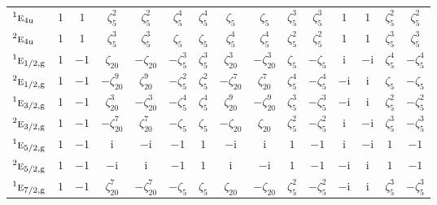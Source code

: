 \documentclass[10pt,a4paper]{article}
\makeatletter
\def\grouprule#1#2{\noalign{\marks\LTgroupmarks{\the\belowrulesep}\nobreak\vskip#1%
  \vskip\aboverulesep}\multispan\LT@cols\unskip{\leaders\hrule\@height#2\hfill\kern\z@}\cr
  \noalign{\penalty\LTrulebreak\vskip\belowrulesep\global\@lastruleclass\z@}}
\numberwithin{equation}{section}
\newcommand{\irr}[1]{\text{\normalfont\scshape #1}}
\newcommand{\conjpair}[1]{{}^{#1}}
\newcommand{\ptag}[1]{\mathrm{#1}}
\newcommand{\iunit}{\mathrm{i}}
\newcommand{\rootunity}[1]{\zeta_{#1}}
\makeatother
\begin{document}
{\begin{longtable}{@{}lcccccccccccccc@{}}
$\conjpair{1}\irr{e}_{4\ptag{u}}$ & $1$ & $1$ & $\rootunity{5}^{2}$ & $\rootunity{5}^{2}$ & $\rootunity{5}^{4}$ & $\rootunity{5}^{4}$ & $\rootunity{5}$ & $\rootunity{5}$ & $\rootunity{5}^{3}$ & $\rootunity{5}^{3}$ & $1$ & $1$ & $\rootunity{5}^{2}$ & $\rootunity{5}^{2}$\\
$\conjpair{2}\irr{e}_{4\ptag{u}}$ & $1$ & $1$ & $\rootunity{5}^{3}$ & $\rootunity{5}^{3}$ & $\rootunity{5}$ & $\rootunity{5}$ & $\rootunity{5}^{4}$ & $\rootunity{5}^{4}$ & $\rootunity{5}^{2}$ & $\rootunity{5}^{2}$ & $1$ & $1$ & $\rootunity{5}^{3}$ & $\rootunity{5}^{3}$\\
\grouprule{0pt}{\lightrulewidth}
$\conjpair{1}\irr{e}_{1/2,\ptag{g}}$ & $1$ & $-1$ & $\rootunity{20}$ & $-\rootunity{20}$ & $-\rootunity{5}^{3}$ & $\rootunity{5}^{3}$ & $\rootunity{20}^{3}$ & $-\rootunity{20}^{3}$ & $\rootunity{5}$ & $-\rootunity{5}$ & $\iunit{}$ & $-\iunit{}$ & $\rootunity{5}^{4}$ & $-\rootunity{5}^{4}$\\
$\conjpair{2}\irr{e}_{1/2,\ptag{g}}$ & $1$ & $-1$ & $-\rootunity{20}^{9}$ & $\rootunity{20}^{9}$ & $-\rootunity{5}^{2}$ & $\rootunity{5}^{2}$ & $-\rootunity{20}^{7}$ & $\rootunity{20}^{7}$ & $\rootunity{5}^{4}$ & $-\rootunity{5}^{4}$ & $-\iunit{}$ & $\iunit{}$ & $\rootunity{5}$ & $-\rootunity{5}$\\
$\conjpair{1}\irr{e}_{3/2,\ptag{g}}$ & $1$ & $-1$ & $\rootunity{20}^{3}$ & $-\rootunity{20}^{3}$ & $-\rootunity{5}^{4}$ & $\rootunity{5}^{4}$ & $\rootunity{20}^{9}$ & $-\rootunity{20}^{9}$ & $\rootunity{5}^{3}$ & $-\rootunity{5}^{3}$ & $-\iunit{}$ & $\iunit{}$ & $\rootunity{5}^{2}$ & $-\rootunity{5}^{2}$\\
$\conjpair{2}\irr{e}_{3/2,\ptag{g}}$ & $1$ & $-1$ & $-\rootunity{20}^{7}$ & $\rootunity{20}^{7}$ & $-\rootunity{5}$ & $\rootunity{5}$ & $-\rootunity{20}$ & $\rootunity{20}$ & $\rootunity{5}^{2}$ & $-\rootunity{5}^{2}$ & $\iunit{}$ & $-\iunit{}$ & $\rootunity{5}^{3}$ & $-\rootunity{5}^{3}$\\
$\conjpair{1}\irr{e}_{5/2,\ptag{g}}$ & $1$ & $-1$ & $\iunit{}$ & $-\iunit{}$ & $-1$ & $1$ & $-\iunit{}$ & $\iunit{}$ & $1$ & $-1$ & $\iunit{}$ & $-\iunit{}$ & $1$ & $-1$\\
$\conjpair{2}\irr{e}_{5/2,\ptag{g}}$ & $1$ & $-1$ & $-\iunit{}$ & $\iunit{}$ & $-1$ & $1$ & $\iunit{}$ & $-\iunit{}$ & $1$ & $-1$ & $-\iunit{}$ & $\iunit{}$ & $1$ & $-1$\\
$\conjpair{1}\irr{e}_{7/2,\ptag{g}}$ & $1$ & $-1$ & $\rootunity{20}^{7}$ & $-\rootunity{20}^{7}$ & $-\rootunity{5}$ & $\rootunity{5}$ & $\rootunity{20}$ & $-\rootunity{20}$ & $\rootunity{5}^{2}$ & $-\rootunity{5}^{2}$ & $-\iunit{}$ & $\iunit{}$ & $\rootunity{5}^{3}$ & $-\rootunity{5}^{3}$\\

\end{longtable}}
\end{document}
